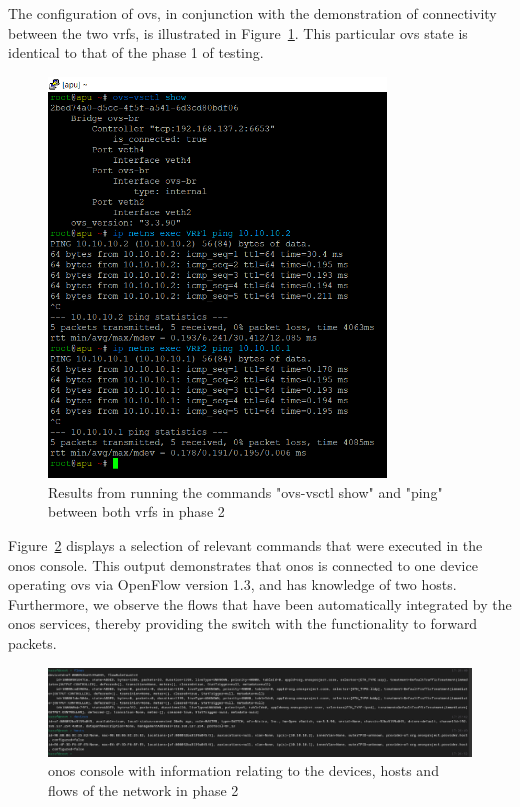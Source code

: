 The configuration of \gls{ovs}, in conjunction with the demonstration of connectivity between the two \glspl{vrf}, is illustrated in Figure~\ref{fig:exp1_phase2_pings}. This particular \gls{ovs} state is identical to that of the phase 1 of testing.

\begin{figure}
	\centering
	\includegraphics[width=0.8\textwidth]{Chapters/Figures/tests/ovs_phase_2/ovs_config_&_pings.PNG}
	\caption{Results from running the commands "ovs-vsctl show" and "ping" between both \glspl{vrf} in phase 2}
	\label{fig:exp1_phase2_pings}
\end{figure}

Figure~\ref{fig:exp1_phase2_onos} displays a selection of relevant commands that were executed in the \gls{onos} console.
This output demonstrates that \gls{onos} is connected to one device operating \gls{ovs} via OpenFlow version 1.3, and has knowledge of two hosts. Furthermore, we observe the flows that have been automatically integrated by the \gls{onos} services, thereby providing the switch with the functionality to forward packets.

\begin{figure}
	\centering
	\includegraphics[width=\textwidth]{Chapters/Figures/tests/ovs_phase_2/onos_topology_&_more.PNG}
	\caption{\gls{onos} console with information relating to the devices, hosts and flows of the network in phase 2}
	\label{fig:exp1_phase2_onos}
\end{figure}

